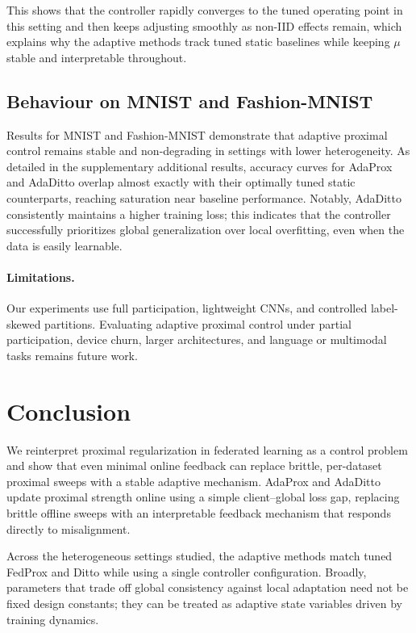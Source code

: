 \documentclass[letterpaper]{article} %
\begin{document}
This shows that the controller rapidly converges to the tuned operating point in this setting and then keeps adjusting smoothly as non-IID effects remain, which explains why the adaptive methods track tuned static baselines while keeping $\mu$ stable and interpretable throughout.

\subsection{Behaviour on MNIST and Fashion-MNIST}

Results for MNIST and Fashion-MNIST demonstrate that adaptive proximal
control remains stable and non-degrading in settings with lower
heterogeneity. As detailed in the supplementary additional results,
accuracy curves for AdaProx and AdaDitto overlap almost exactly with
their optimally tuned static counterparts, reaching saturation near
baseline performance.
Notably, AdaDitto consistently maintains a higher training loss; this
indicates that the controller successfully prioritizes global
generalization over local overfitting, even when the data is easily
learnable.


\paragraph{Limitations.}
Our experiments use full participation, lightweight CNNs, and controlled label-skewed partitions. Evaluating adaptive proximal control under partial participation, device churn, larger architectures, and language or multimodal tasks remains future work.

\section{Conclusion}
We reinterpret proximal regularization in federated learning as a control problem and show that even minimal online feedback can replace brittle, per-dataset proximal sweeps with a stable adaptive mechanism. AdaProx and AdaDitto update proximal strength online using a simple client--global loss gap, replacing brittle offline sweeps with an interpretable feedback mechanism that responds directly to misalignment.

Across the heterogeneous settings studied, the adaptive methods match tuned FedProx and Ditto while using a single controller configuration. Broadly, parameters that trade off global consistency against local adaptation need not be fixed design constants; they can be treated as adaptive state variables driven by training dynamics.



% 
\end{document}
